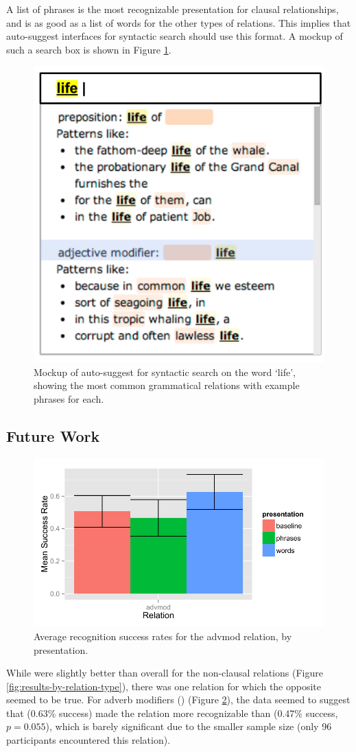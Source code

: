 
A list of phrases is the most recognizable presentation for clausal relationships, and is as good as a list of words for the other types of relations. This implies that auto-suggest interfaces for syntactic search should use this format. A mockup of such a search box is shown in Figure \ref{fig:phrases-mockup}.
\begin{figure}
\centering
\includegraphics[width=0.5\columnwidth]{fig/phrases-mockup}
\caption{
	\label{fig:phrases-mockup} Mockup of auto-suggest for syntactic search on the word `life', showing the most common grammatical relations with example phrases for each.
}
\end{figure}

\subsection{Future Work}
\begin{figure}
\includegraphics[width=1.0\columnwidth]{fig/advmod}
\caption{
	\label{fig:advmod} Average recognition success rates for the advmod relation, by presentation.
}
\end{figure}
While  were slightly better than  overall for the non-clausal relations (Figure \ref{fig:results-by-relation-type}), there was one relation for which the opposite seemed to be true. For adverb modifiers () (Figure \ref{fig:advmod}), the data seemed to suggest that  (0.63\% success) made the relation more recognizable than  (0.47\% success, $p = 0.055$), which is barely significant due to the smaller sample size (only 96 participants encountered this relation).

